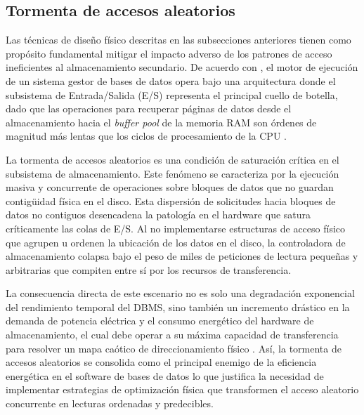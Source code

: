 \documentclass[12pt, letter paper]{report}
\begin{document}
      \subsection{Tormenta de accesos aleatorios} %
      \label{sub:tormenta_de_accesos_aleatorios}
        Las técnicas de diseño físico descritas en las subsecciones anteriores
        tienen como propósito fundamental mitigar el impacto adverso de los
        patrones de acceso ineficientes al almacenamiento secundario. De acuerdo
        con \cite{hellerstein2007architecture}, el motor de ejecución de un
        sistema gestor de bases de datos opera bajo una arquitectura donde el
        subsistema de Entrada/Salida (E/S) representa el principal cuello de
        botella, dado que las operaciones para recuperar páginas de datos desde
        el almacenamiento hacia el \textit{buffer pool} de la memoria RAM son
        órdenes de magnitud más lentas que los ciclos de procesamiento de la CPU
        \cite{hellerstein2007architecture}.

        La tormenta de accesos aleatorios es una condición de saturación crítica
        en el subsistema de almacenamiento. Este fenómeno se caracteriza por la
        ejecución masiva y concurrente de operaciones sobre bloques de datos que
        no guardan contigüidad física en el disco. Esta dispersión de
        solicitudes hacia bloques de datos no contiguos desencadena la patología
        en el hardware que satura críticamente las colas de E/S. Al no
        implementarse estructuras de acceso físico que agrupen u ordenen la
        ubicación de los datos en el disco, la controladora de almacenamiento
        colapsa bajo el peso de miles de peticiones de lectura pequeñas y
        arbitrarias que compiten entre sí por los recursos de transferencia.

        La consecuencia directa de este escenario no es solo una degradación
        exponencial del rendimiento temporal del DBMS, sino también un
        incremento drástico en la demanda de potencia eléctrica y el consumo
        energético del hardware de almacenamiento, el cual debe operar a su
        máxima capacidad de transferencia para resolver un mapa caótico de
        direccionamiento físico \cite{graefe1993query,
        hellerstein2007architecture}. Así, la tormenta de accesos aleatorios se
        consolida como el principal enemigo de la eficiencia energética en el
        software de bases de datos lo que justifica la necesidad de implementar
        estrategias de optimización física que transformen el acceso aleatorio
        concurrente en lecturas ordenadas y predecibles.
\end{document}
